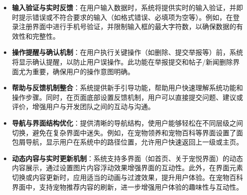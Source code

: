 \begin{itemize}
	\item \textbf{输入验证与实时反馈}：在用户输入数据时，系统将提供实时的输入验证，并即时提示错误或不符合要求的输入（如格式错误、必填项为空等）。例如，在登录注册界面中进行手机号验证，并限制输入框的最大字符数，以确保数据的有效性和完整性。
	\item \textbf{操作提醒与确认机制}：在用户执行关键操作（如删除、提交举报等）前，系统将显示确认提醒，以防止用户误操作。此功能在举报提交和帖子/新闻删除界面尤为重要，确保用户的操作意图明确。
	\item \textbf{帮助与反馈机制整合}：系统提供新手引导功能，帮助用户快速理解系统功能和操作步骤。同时，在页面底部设置反馈机制，用户可以直接提交问题、建议或评价，增强用户与开发团队之间的互动与沟通。
	\item \textbf{导航与界面结构优化}：提供清晰的导航结构，使用户能够轻松在不同层级之间切换，避免在复杂界面中迷失。例如，在宠物领养和宠物百科等界面设置了面包屑导航，显示用户在系统中的路径位置，允许用户快速返回上一级或主页。
	\item \textbf{动态内容与实时更新机制}：系统支持多界面（如首页、关于宠悦界面）的动态内容展示，通过设置图片内容浮动效果增强界面的互动性。此外，在界面元素切换或内容更新时，应用适当的动画与过渡效果，提升用户体验。在宠物百科界面中，支持宠物推荐内容的刷新，进一步增强用户体验的趣味性与互动性。
\end{itemize}